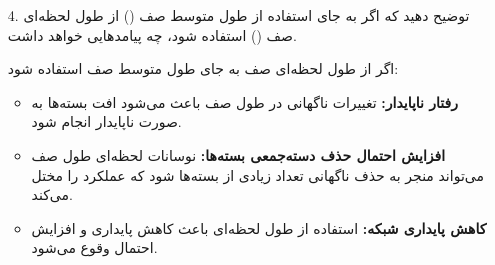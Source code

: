 \begin{enumerate}
	\item [4. ]
	توضیح دهید که اگر به جای استفاده از طول متوسط صف () از طول لحظه‌ای صف () استفاده شود، چه پیامد‌هایی خواهد داشت.
	
	\begin{qsolve}
		اگر از طول لحظه‌ای صف به جای طول متوسط صف استفاده شود:
		\begin{itemize}
			\item \textbf{رفتار ناپایدار:} تغییرات ناگهانی در طول صف باعث می‌شود افت بسته‌ها به صورت ناپایدار انجام شود.
			\item \textbf{افزایش احتمال حذف دسته‌جمعی بسته‌ها:} نوسانات لحظه‌ای طول صف می‌تواند منجر به حذف ناگهانی تعداد زیادی از بسته‌ها شود که عملکرد  را مختل می‌کند.
			\item \textbf{کاهش پایداری شبکه:} استفاده از طول لحظه‌ای باعث کاهش پایداری و افزایش احتمال وقوع  می‌شود.
		\end{itemize}
		
	\end{qsolve}
	
	
	

\end{enumerate}
